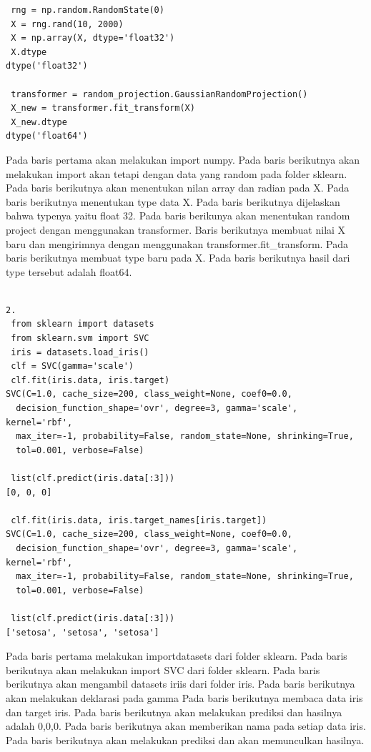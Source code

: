 \begin{enumerate}
\begin{verbatim}
 rng = np.random.RandomState(0)
 X = rng.rand(10, 2000)
 X = np.array(X, dtype='float32')
 X.dtype
dtype('float32')

 transformer = random_projection.GaussianRandomProjection()
 X_new = transformer.fit_transform(X)
 X_new.dtype
dtype('float64')

\end{verbatim}
\subitem
Pada baris pertama akan melakukan import numpy.
Pada baris berikutnya akan melakukan import akan tetapi dengan data yang random pada folder sklearn.
Pada baris berikutnya akan menentukan nilan array dan radian pada X.
Pada baris berikutnya menentukan type data X.
Pada baris berikutnya dijelaskan bahwa typenya yaitu float 32.
Pada baris berikunya akan menentukan random project dengan menggunakan transformer.
Baris berikutnya membuat nilai X baru dan mengirimnya dengan menggunakan transformer.fit\_transform.
Pada baris berikutnya membuat type baru pada X.
Pada baris berikutnya hasil dari type tersebut adalah float64.

\begin{verbatim}

2.
 from sklearn import datasets
 from sklearn.svm import SVC
 iris = datasets.load_iris()
 clf = SVC(gamma='scale')
 clf.fit(iris.data, iris.target)  
SVC(C=1.0, cache_size=200, class_weight=None, coef0=0.0,
  decision_function_shape='ovr', degree=3, gamma='scale', kernel='rbf',
  max_iter=-1, probability=False, random_state=None, shrinking=True,
  tol=0.001, verbose=False)

 list(clf.predict(iris.data[:3]))
[0, 0, 0]

 clf.fit(iris.data, iris.target_names[iris.target])  
SVC(C=1.0, cache_size=200, class_weight=None, coef0=0.0,
  decision_function_shape='ovr', degree=3, gamma='scale', kernel='rbf',
  max_iter=-1, probability=False, random_state=None, shrinking=True,
  tol=0.001, verbose=False)

 list(clf.predict(iris.data[:3]))  
['setosa', 'setosa', 'setosa']

\end{verbatim}
\subitem
Pada baris pertama melakukan importdatasets dari folder sklearn.
Pada baris berikutnya akan melakukan import SVC dari folder sklearn.
Pada baris berikutnya akan mengambil datasets iriis dari folder iris.
Pada baris berikutnya akan melakukan deklarasi pada gamma
Pada baris berikutnya membaca data iris dan target iris.
Pada baris berikutnya akan melakukan prediksi dan hasilnya adalah 0,0,0.
Pada baris berikutnya akan memberikan nama pada setiap data iris.
Pada baris berikutnya akan melakukan prediksi dan akan memunculkan hasilnya.


\end{enumerate}
